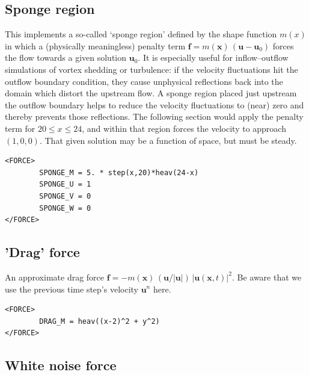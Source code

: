 \documentclass[11pt]{report}
\begin{document}
\subsection{Sponge region}
\label{sec.sponge}

This implements a so-called `sponge region' defined by the shape
function $m(x)$ in which a (physically meaningless) penalty term
$\bm{f} = m(\bm{x}) \, (\bm{u} - \bm{u}_0)$ forces the flow towards a
given solution $\bm{u}_0$.  It is especially useful for
inflow--outflow simulations of vortex shedding or turbulence: if the
velocity fluctuations hit the outflow boundary condition, they cause
unphysical reflections back into the domain which distort the upstream
flow. A sponge region placed just upstream the outflow boundary helps
to reduce the velocity fluctuations to (near) zero and thereby prevents
those reflections. The following section would apply the penalty term
for $20 \le x \le 24$, and within that region forces the velocity to
approach~$(1, 0, 0).$ That given solution may be a function of space,
but must be steady.
\begin{verbatim}
<FORCE>
        SPONGE_M = 5. * step(x,20)*heav(24-x)
        SPONGE_U = 1
        SPONGE_V = 0
        SPONGE_W = 0
</FORCE>
\end{verbatim}

\subsection{'Drag' force}

An approximate drag force
$\bm{f} = - m(\bm{x}) \, (\bm{u}/|\bm{u}|)\, |\bm{u}(\bm{x},
t)|^2$.
Be aware that we use the previous time step's velocity $\bm{u}^{n}$ here.
\begin{verbatim}
<FORCE>
        DRAG_M = heav((x-2)^2 + y^2)
</FORCE>
\end{verbatim}

\subsection{White noise force}
\end{document}
